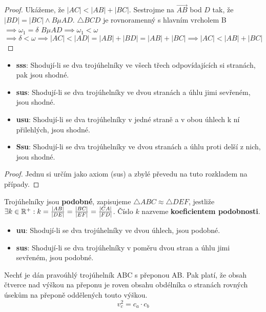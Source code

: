 \begin{proof}
  Ukážeme, že $|AC| < |AB| + |BC|$. Sestrojme na $\overrightarrow{AB}$ bod $D$ tak, že $|BD| = |BC| \land B \mu AD$. $\triangle BCD$ je rovnoramenný s hlavním vrcholem B $\implies \omega_1 = \delta$
  $B \mu AD \implies \omega_1 < \omega$
  $\implies \delta < \omega \implies |AC| < |AD| = |AB| + |BD| = |AB| + |BC| \implies |AC| < |AB| + |BC|$
\end{proof}

\begin{veta}
  \begin{itemize}
    \item \textbf{sss}: Shodují-li se dva trojúhelníky ve všech třech odpovídajících si stranách, pak jsou shodné.
    \item \textbf{sus}: Shodují-li se dva trojúhelníky ve dvou stranách a úhlu jimi sevřeném, jsou shodné.
    \item \textbf{usu}: Shodují-li se dva trojúhelníky v jedné straně a v obou úhlech k ní přilehlých, jsou shodné.
    \item \textbf{Ssu}: Shodují-li se dva trojúhelníky ve dvou stranách a úhlu proti delší z nich, jsou shodné.
  \end{itemize}
\end{veta}

\begin{proof}
  Jednu si určím jako axiom (sus) a zbylé převedu na tuto rozkladem na případy.
\end{proof}

\begin{definition}
  Trojúhelníky jsou \textbf{podobné}, zapisujeme $\triangle ABC \approx \triangle DEF$, jestliže $\exists k \in \mathbb{R}^+:k = \frac{|AB|}{|DE|}=\frac{|BC|}{|EF|}=\frac{|CA|}{|FD|}$. Číslo $k$ nazveme \textbf{koeficientem podobnosti}.
\end{definition}

\begin{veta}
  \begin{itemize}
    \item \textbf{uu}: Shodují-li se dva trojúhelníky ve dvou úhlech, jsou podobné.
    \item \textbf{sus}: Shodují-li se dva trojúhelníky v poměru dvou stran a úhlu jimi sevřeném, jsou podobné.
  \end{itemize}
\end{veta}

\begin{veta}
  Nechť je dán pravoúhlý trojúhelník ABC s přeponou AB. Pak platí, že obsah čtverce nad výškou na přeponu je roven obsahu obdélníka o stranách rovných úsekům na přeponě oddělených touto výškou.
  $$v_c^2 = c_a \cdot c_b$$
\end{veta}

